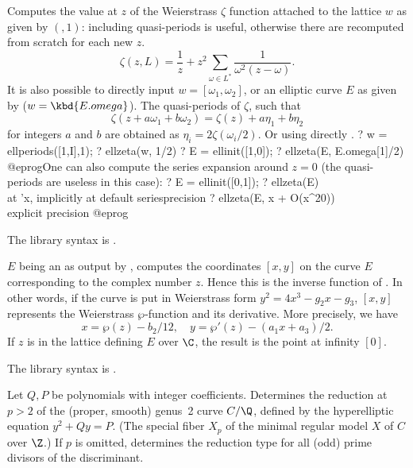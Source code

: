 \label{se:ellzeta}
Computes the value at $z$ of the Weierstrass $\zeta$ function attached to
the lattice $w$ as given by $(,1)$: including quasi-periods
is useful, otherwise there are recomputed from scratch for each new $z$.
$$ \zeta(z, L) = \dfrac{1}{z} + z^2\sum_{\omega\in L^*}
\dfrac{1}{\omega^2(z-\omega)}.$$
It is also possible to directly input $w = [\omega_1,\omega_2]$,
or an elliptic curve $E$ as given by  ($w = \kbd{E.omega}$).
The quasi-periods of $\zeta$, such that
$$\zeta(z + a\omega_1 + b\omega_2) = \zeta(z) + a\eta_1 + b\eta_2 $$
for integers $a$ and $b$ are obtained as $\eta_i = 2\zeta(\omega_i/2)$.
Or using directly .
\bprog
? w = ellperiods([1,I],1);
? ellzeta(w, 1/2)
? E = ellinit([1,0]);
? ellzeta(E, E.omega[1]/2)
@eprog\noindent One can also compute the series expansion around $z = 0$
(the quasi-periods are useless in this case):
\bprog
? E = ellinit([0,1]);
? ellzeta(E) \\ at 'x, implicitly at default seriesprecision
? ellzeta(E, x + O(x^20)) \\ explicit precision
@eprog\noindent

The library syntax is .

\label{se:ellztopoint}
$E$ being an  as output by
, computes the coordinates $[x,y]$ on the curve $E$
corresponding to the complex number $z$. Hence this is the inverse function
of . In other words, if the curve is put in Weierstrass
form $y^2 = 4x^3 - g_2x - g_3$, $[x,y]$ represents the Weierstrass
$\wp$-function and its derivative. More
precisely, we have
$$x = \wp(z) - b_2/12,\quad y = \wp'(z) - (a_1 x + a_3)/2.$$
If $z$ is in the lattice defining $E$ over $\C$, the result is the point at
infinity $[0]$.

The library syntax is .

\label{se:genus2red}
Let $Q,P$ be polynomials with integer coefficients.
Determines the reduction at $p > 2$ of the (proper, smooth) genus~2
curve $C/\Q$, defined by the hyperelliptic equation $y^2+Qy = P$. (The
special fiber $X_p$ of the minimal regular model $X$ of $C$ over $\Z$.)
If $p$ is omitted, determines the reduction type for all (odd) prime
divisors of the discriminant.

